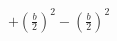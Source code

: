 \documentclass[preview]{standalone}
\begin{document}
\begin{align*}
+ \left(\frac{b}{2}\right)^2 - \left(\frac{b}{2}\right)^2
\end{align*}
\end{document}

